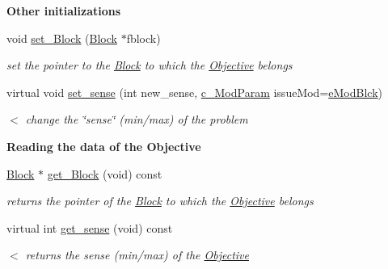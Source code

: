 \begin{Indent}\textbf{ Other initializations}\par
\begin{DoxyCompactItemize}
\item 
void \mbox{\hyperlink{class_s_m_spp__di__unipi__it_1_1_objective_ae25adfb4d0355dc999de19a850b0025d}{set\+\_\+\+Block}} (\mbox{\hyperlink{class_s_m_spp__di__unipi__it_1_1_block}{Block}} $\ast$fblock)
\begin{DoxyCompactList}\small\item\em set the pointer to the \mbox{\hyperlink{class_s_m_spp__di__unipi__it_1_1_block}{Block}} to which the \mbox{\hyperlink{class_s_m_spp__di__unipi__it_1_1_objective}{Objective}} belongs \end{DoxyCompactList}\item 
virtual void \mbox{\hyperlink{class_s_m_spp__di__unipi__it_1_1_objective_ac8a312b13d860de392750856449ef2a8}{set\+\_\+sense}} (int new\+\_\+sense, \mbox{\hyperlink{group___modification___t_y_p_e_s_ga544246d8c462e9a2d817c2c30797968f}{c\+\_\+\+Mod\+Param}} issue\+Mod=\mbox{\hyperlink{group___modification___t_y_p_e_s_gga48fddcdd03a03f49b7e389ca1ed938d4a21b14b26b1c0093a0905f6fc010bad29}{e\+Mod\+Blck}})
\begin{DoxyCompactList}\small\item\em $<$ change the \char`\"{}sense\char`\"{} (min/max) of the problem \end{DoxyCompactList}\end{DoxyCompactItemize}
\end{Indent}
\begin{Indent}\textbf{ Reading the data of the Objective}\par
\begin{DoxyCompactItemize}
\item 
\mbox{\label{class_s_m_spp__di__unipi__it_1_1_objective_abb90eec380b99ebb3d015f6d5f9e26b8}} 
\mbox{\hyperlink{class_s_m_spp__di__unipi__it_1_1_block}{Block}} $\ast$ \mbox{\hyperlink{class_s_m_spp__di__unipi__it_1_1_objective_abb90eec380b99ebb3d015f6d5f9e26b8}{get\+\_\+\+Block}} (void) const
\begin{DoxyCompactList}\small\item\em returns the pointer of the \mbox{\hyperlink{class_s_m_spp__di__unipi__it_1_1_block}{Block}} to which the \mbox{\hyperlink{class_s_m_spp__di__unipi__it_1_1_objective}{Objective}} belongs \end{DoxyCompactList}\item 
\mbox{\label{class_s_m_spp__di__unipi__it_1_1_objective_ae08259a678ad9fc42d24e6b2bc84a318}} 
virtual int \mbox{\hyperlink{class_s_m_spp__di__unipi__it_1_1_objective_ae08259a678ad9fc42d24e6b2bc84a318}{get\+\_\+sense}} (void) const
\begin{DoxyCompactList}\small\item\em $<$ returns the sense (min/max) of the \mbox{\hyperlink{class_s_m_spp__di__unipi__it_1_1_objective}{Objective}} \end{DoxyCompactList}\end{DoxyCompactItemize}
\end{Indent}
